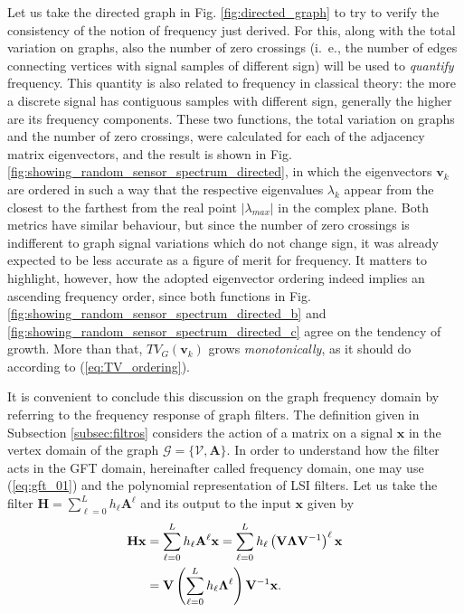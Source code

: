 Let us take the directed graph in Fig. \ref{fig:directed_graph} to try to verify the consistency of the notion of frequency just derived. For this, along with the total variation on graphs, also the number of zero crossings (i.~e., the number of edges connecting vertices with signal samples of different sign) will be used to \emph{quantify} frequency. This quantity is also related to frequency in classical theory: the more a discrete signal has contiguous samples with different sign, generally the higher are its frequency components. These two functions, the total variation on graphs and the number of zero crossings, were calculated for each of the adjacency matrix eigenvectors, and the result is shown in Fig. \ref{fig:showing_random_sensor_spectrum_directed}, in which the eigenvectors $ \mathbf{v}_k $ are ordered in such a way that the respective eigenvalues $ \lambda_k $ appear from the closest to the farthest from the real point $ |\lambda_{max}| $ in the complex plane. Both metrics have similar behaviour, but since the number of zero crossings is indifferent to graph signal variations which do not change sign, it was already expected to be less accurate as a figure of merit for frequency. It matters to highlight, however, how the adopted eigenvector ordering indeed implies an ascending frequency order, since both functions in Fig. \ref{fig:showing_random_sensor_spectrum_directed_b} and \ref{fig:showing_random_sensor_spectrum_directed_c} agree on the tendency of growth. More than that, $ TV_G(\mathbf{v}_k) $ grows \emph{monotonically}, as it should do according to (\ref{eq:TV_ordering}).

It is convenient to conclude this discussion on the graph frequency domain by referring to the frequency response of graph filters. The definition given in Subsection \ref{subsec:filtros} considers the action of a matrix on a signal $ \mathbf{x} $ in the vertex domain of the graph $ \mathcal{G} = \{\mathcal{V}, \mathbf{A}\} $. In order to understand how the filter acts in the GFT domain, hereinafter called frequency domain, one may use (\ref{eq:gft_01}) and the polynomial representation of LSI filters. Let us take the filter $ \mathbf{H} =\sum_{\ell=0}^{L} h_\ell \mathbf{A}^\ell $ and its output to the input $ \mathbf{x} $ given by
\begin{align}\label{eq:resposta_freq_01}
\mathbf{H} \mathbf{x} &= \sum_{\ell=0}^{L} h_\ell \mathbf{A}^\ell \mathbf{x} =
\sum_{\ell=0}^{L} h_\ell \left(\mathbf{V} \mathbf{\Lambda} \mathbf{V}^{-1}\right)^\ell \mathbf{x} \notag \\
&= \mathbf{V} \left(\sum_{\ell=0}^{L} h_\ell \mathbf{\Lambda}^\ell \right) \mathbf{V}^{-1} \mathbf{x}.
\end{align}

